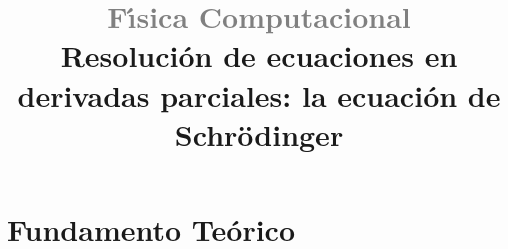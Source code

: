 \documentclass[12pt,spanish]{iopart}
\begin{document}
\title{\textcolor{gray}{F{\'\i}sica Computacional} \\ Resoluci{\'o}n de ecuaciones en derivadas parciales: la ecuaci{\'o}n de Schr\"odinger}


%
%

%
%
%
%
%
%


\newpage

%





\section{Fundamento Te\'orico}
\end{document}
